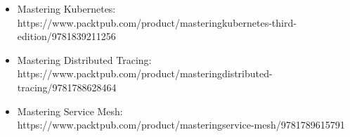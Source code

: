 

\begin{itemize}
\item 
Mastering Kubernetes: https://www.packtpub.com/product/masteringkubernetes-third-edition/9781839211256

\item 
Mastering Distributed Tracing: https://www.packtpub.com/product/masteringdistributed-tracing/9781788628464

\item 
Mastering Service Mesh: https://www.packtpub.com/product/masteringservice-mesh/9781789615791
\end{itemize}